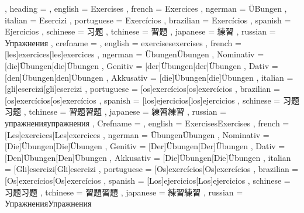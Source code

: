   {
    , heading =   {
                    , english     = Exercises
                    , french      = Exercices
                    , ngerman     = ÜBungen
                    , italian     = Esercizi
                    , portuguese  = Exercícios
                    , brazilian   = Exercícios
                    , spanish     = Ejercicios
                    , schinese    = 习题
                    , tchinese    = 習題
                    , japanese    = 練習
                    , russian     = Упражнения
                  }
    , crefname =  {
                    , english     = {exercises}{exercises}
                    , french      = [les]{exercices}[les]{exercices}
                    , ngerman     = { {Übungen}{Übungen}
                                      , Nominativ = [die]{Übungen}[die]{Übungen}
                                      , Genitiv   = [der]{Übungen}[der]{Übungen}
                                      , Dativ     = [den]{Übungen}[den]{Übungen}
                                      , Akkusativ = [die]{Übungen}[die]{Übungen}
                                    }
                    , italian     = [gli]{esercizi}[gli]{esercizi}
                    , portuguese  = [os]{exercícios}[os]{exercícios}
                    , brazilian   = [os]{exercícios}[os]{exercícios}
                    , spanish     = [los]{ejercicios}[los]{ejercicios}
                    , schinese    = {习题}{习题}
                    , tchinese    = {習題}{習題}
                    , japanese    = {練習}{練習}
                    , russian     = {упражнения}{упражнения}
                  }
    , Crefname =  {
                    , english     = {Exercises}{Exercises}
                    , french      = [Les]{exercices}[Les]{exercices}
                    , ngerman     = { {Übungen}{Übungen}
                                      , Nominativ = [Die]{Übungen}[Die]{Übungen}
                                      , Genitiv   = [Der]{Übungen}[Der]{Übungen}
                                      , Dativ     = [Den]{Übungen}[Den]{Übungen}
                                      , Akkusativ = [Die]{Übungen}[Die]{Übungen}
                                    }
                    , italian     = [Gli]{esercizi}[Gli]{esercizi}
                    , portuguese  = [Os]{exercícios}[Os]{exercícios}
                    , brazilian   = [Os]{exercícios}[Os]{exercícios}
                    , spanish     = [Los]{ejercicios}[Los]{ejercicios}
                    , schinese    = {习题}{习题}
                    , tchinese    = {習題}{習題}
                    , japanese    = {練習}{練習}
                    , russian     = {Упражнения}{Упражнения}
                  }
  }

